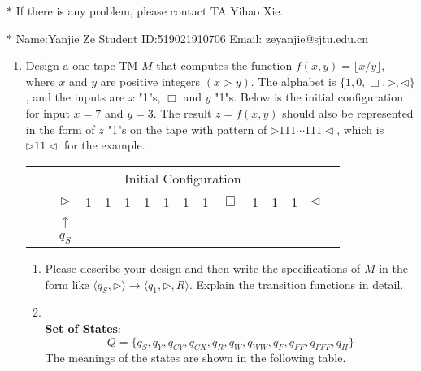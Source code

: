 \documentclass[12pt,a4paper]{article}
\makeatletter
\newtheorem*{solution}{Solution}
\theoremstyle{definition}
\renewenvironment{solution}[1][Solution] {\par\pushQED{\qed}\normalfont\topsep6\p@\@plus6\p@\relax\trivlist\item[\hskip\labelsep\bfseries#1\@addpunct{.}]\ignorespaces}{\popQED\endtrivlist\@endpefalse} \makeatother
\makeatother
\begin{document}
\noindent

\noindent{}
\begin{center}
\footnotesize{\color{red}$*$ If there is any problem, please contact TA Yihao Xie. }

\footnotesize{\color{blue}$*$ Name:Yanjie Ze  \quad Student ID:519021910706 \quad Email: zeyanjie@sjtu.edu.cn}
\end{center}

\begin{enumerate}
    \item Design a one-tape TM $M$ that computes the function $f(x, y) = \lfloor x/y \rfloor$, where $x$ and $y$ are positive integers $(x > y)$. The alphabet is $\{1, 0, \Box, \triangleright, \triangleleft\}$, and the inputs are $x$ "1"s, $\Box$ and $y$ "1"s. Below is the initial configuration for input $x=7$ and $y=3$. The result $z=f(x,y)$ should also be represented in the form of $z$ "1"s on the tape with pattern of $\rhd 111\cdots 111\lhd$, which is $\rhd 11\lhd$ for the example.
    
	\begin{center}
		\begin{tabular}{ll|c|c|c|c|c|c|c|c|c|c|c|c|c|c}
			& \multicolumn{14}{c}{Initial Configuration}\\[5pt]
			\cline{2-16}
			& & $\triangleright$ &  1  & 1 & 1 & 1 & 1 & 1 & 1 & $\Box$ & 1 & 1 & 1 & $ \triangleleft$ & \\
			\cline{2-16}
			\multicolumn{2}{c}{} & \multicolumn{1}{c}{$\uparrow$} & \multicolumn{11}{c}{}\\[-4pt]
			\multicolumn{2}{c}{} & \multicolumn{1}{c}{$q_S$} & \multicolumn{11}{c}{}	
		\end{tabular}
	\end{center}

    \begin{enumerate}
	\item
	Please describe your design and then write the specifications of $M$ in the form like $\langle q_S, \triangleright \rangle \rightarrow \langle q_1, \triangleright,  R\rangle$. Explain the transition functions in detail.
	\begin{solution}
	~\\
	\textbf{Set of States}:
	$$
	Q=\{q_S, q_Y, q_{CY}, q_{CX}, q_R,q_W,q_{WW},q_F,q_{FF},q_{FFF}, q_H\}
	$$
	The meanings of the states are shown in the following table.
	

\end{solution}
\end{enumerate}
\end{enumerate}
\end{document}
